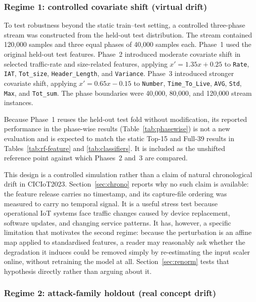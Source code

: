 \documentclass[11pt,a4paper]{article}
\newcommand{\feat}[1]{\texttt{#1}}
\begin{document}
\subsubsection{Regime 1: controlled covariate shift (virtual drift)}

To test robustness beyond the static train--test setting, a controlled
three-phase stream was constructed from the held-out test distribution.
The stream contained 120{,}000 samples and three equal phases of
40{,}000 samples each. Phase~1 used the original held-out test features.
Phase~2 introduced moderate covariate shift in selected traffic-rate and
size-related features, applying $x' = 1.35x + 0.25$ to \feat{Rate},
\feat{IAT}, \feat{Tot\_size}, \feat{Header\_Length}, and
\feat{Variance}. Phase~3 introduced stronger covariate shift, applying
$x' = 0.65x - 0.15$ to \feat{Number}, \feat{Time\_To\_Live}, \feat{AVG},
\feat{Std}, \feat{Max}, and \feat{Tot\_sum}. The phase boundaries were
40{,}000, 80{,}000, and 120{,}000 stream instances.

Because Phase~1 reuses the held-out test fold without modification, its
reported performance in the phase-wise results
(Table~\ref{tab:phasewise}) is not a new evaluation and is expected to
match the static Top-15 and Full-39 results in
Tables~\ref{tab:rf-feature} and \ref{tab:classifiers}. It is included as
the unshifted reference point against which Phases~2 and~3 are compared.

This design is a controlled simulation rather than a claim of natural
chronological drift in CICIoT2023. Section~\ref{sec:chrono} reports why no
such claim is available: the feature release carries no timestamp, and its
capture-file ordering was measured to carry no temporal signal. It is a useful stress test because
operational IoT systems face traffic changes caused by device replacement,
software updates, and changing service patterns. It has, however, a specific
limitation that motivates the second regime: because the perturbation is an
affine map applied to standardised features, a reader may reasonably ask whether
the degradation it induces could be removed simply by re-estimating the input
scaler online, without retraining the model at all. Section~\ref{sec:renorm}
tests that hypothesis directly rather than arguing about it.

\subsubsection{Regime 2: attack-family holdout (real concept drift)}
\label{sec:familystream}
\end{document}
